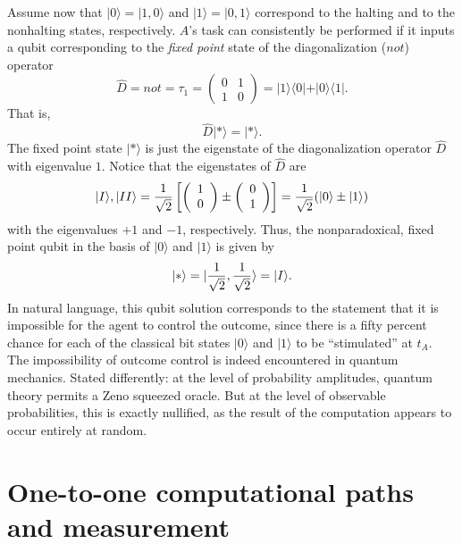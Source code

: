 Assume now that
$\vert 0\rangle =
\vert 1,0\rangle
$
and $\vert 1\rangle =
\vert 0,1\rangle
$
 correspond to the halting and to the nonhalting
states, respectively.
$A$'s task can consistently be performed
if it inputs a qubit corresponding to the {\em fixed point} state
of the diagonalization ($not$) operator
$$
\widehat{D}= not=
\tau_1 =
\left(
\begin{array}{cc}
0 & 1\\
1 & 0
\end{array}
\right) =\vert 1\rangle \langle 0\vert
+ \vert 0\rangle \langle 1\vert    .
$$
That is,
\begin{equation}
\widehat{D}\vert \ast \rangle =\vert \ast \rangle  .
\end{equation}
The fixed point state $\vert \ast \rangle $ is
just the eigenstate of the diagonalization operator
$\widehat{D}$ with
eigenvalue $1$.
Notice that the eigenstates of
$\widehat{D}$ are
\begin{equation}
\vert I\rangle      ,
\vert II\rangle
=
{1\over \sqrt{2}}\left[
\left( \begin{array}{c}1\\ 0\end{array} \right)\pm
\left( \begin{array}{c}0\\ 1\end{array} \right)
\right]
=
{1\over \sqrt{2}}(\vert 0\rangle \pm \vert 1\rangle )
\end{equation}
with the  eigenvalues $+1$ and $-1$, respectively.
Thus, the nonparadoxical, fixed point qubit
in the basis of $\vert 0\rangle $ and $\vert 1\rangle $ is given by
\begin{equation}
\vert \ast \rangle =\vert {1\over \sqrt{2}},{1\over \sqrt{2}} \rangle
=\vert I\rangle .
\end{equation}
In natural language,
this qubit solution corresponds to the statement that
it is impossible
for the agent to control the outcome, since
 there is a
fifty percent chance for each of the  classical bit states $\vert
0\rangle$ and
$\vert 1\rangle$ to be ``stimulated'' at
$t_{A}$.
The impossibility of outcome control
is
indeed encountered
in quantum mechanics.
Stated differently: at the level of probability amplitudes, quantum
theory permits a Zeno squeezed oracle.  But at the level
of observable
probabilities, this is exactly nullified, as
the result of the computation
 appears to
occur entirely at random.


\section{One-to-one computational paths and measurement}

